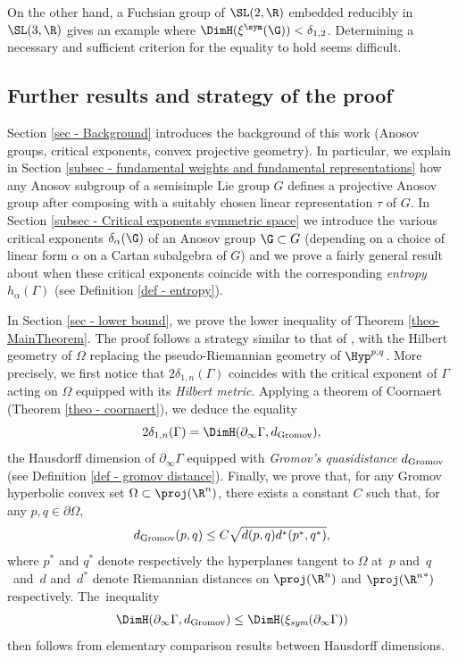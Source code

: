 On the other hand, a Fuchsian group of $\SL(2,\R)$ embedded reducibly in $\SL(3,\R)$ gives an example where $\DimH(\xi^{\sym}(\G)) < \delta_{1,2}$. Determining a necessary and sufficient criterion for the equality to hold seems difficult.

\subsection{Further results and strategy of the proof}

Section \ref{sec - Background} introduces the background of this work (Anosov groups, critical exponents, convex projective geometry). In particular, we explain in Section \ref{subsec - fundamental weights and fundamental representations} how any Anosov subgroup of a semisimple Lie group $G$ defines a projective Anosov group after composing with a suitably chosen linear representation $\tau$ of $G$. In Section \ref{subsec - Critical exponents symmetric space} we introduce the various critical exponents $\delta_\alpha(\G)$ of an Anosov group $\G\subset G$ (depending on a choice of linear form $\alpha$ on a Cartan subalgebra of $G$) and we prove a fairly general result about when these critical exponents coincide with the corresponding \emph{entropy} $h_\alpha(\Gamma)$ (see Definition \ref{def - entropy}).

In Section \ref{sec - lower bound}, we prove the lower inequality of Theorem \ref{theo-MainTheorem}. The proof follows a strategy similar to that of \cite{GM18}, with the Hilbert geometry of $\Omega$ replacing the pseudo-Riemannian geometry of $\Hyp^{p,q}$. More precisely, we first notice that $2\delta_{1,n}(\Gamma)$ coincides with the critical exponent of $\Gamma$ acting on $\Omega$ equipped with its \emph{Hilbert metric}. Applying a theorem of Coornaert (Theorem \ref{theo - coornaert}), we deduce the equality\vspace*{-3pt}
\[2\delta_{1,n}(\Gamma) = \DimH(\partial_\infty \Gamma, d_{\textup{Gromov}}),\]
the Hausdorff dimension of $\partial_\infty \Gamma$ equipped with \emph{Gromov's quasidistance} $d_{\textup{Gromov}}$ (see Definition \ref{def - gromov distance}). Finally, we prove that, for any Gromov hyperbolic convex set $\Omega \subset \proj(\R^n)$, there exists a constant $C$ such that, for any $p,q\in \partial \Omega$,\vspace*{-3pt}
\[d_{\textup{Gromov}}(p,q) \leq C \sqrt{d(p,q) d^*(p^*,q^*)},\]
where $p^*$ and $q^*$ denote respectively the hyperplanes tangent to $\Omega$ at~$p$ and~$q$~and~$d$ and~$d^*$ denote Riemannian distances on $\proj(\R^n)$ and $\proj({\R^n}^*)$ respectively. The~\hbox{inequality}\vspace*{-3pt}
\[\DimH(\partial_\infty \Gamma, d_{\textup{Gromov}}) \leq \DimH(\xi_{\textit{sym}}(\partial_\infty \Gamma))\]
then follows from elementary comparison results between Hausdorff dimensions.

